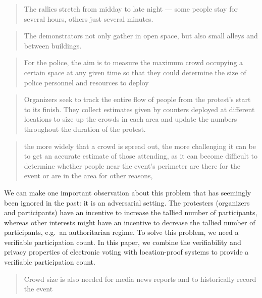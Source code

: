 \blockcquote{2016DemonstrationsInSeoul}{%
  The rallies stretch from midday to late night --- some people stay for 
  several hours, others just several minutes.%
}

\blockcquote{2016DemonstrationsInSeoul}{%
  The demonstrators not only gather in open space, but also small alleys and 
  between buildings.%
}

\blockcquote{2016DemonstrationsInSeoul}{%
  For the police, the aim is to measure the maximum crowd occupying a certain 
  space at any given time so that they could determine the size of police 
  personnel and resources to deploy%
}

\blockcquote{2016DemonstrationsInSeoul}{%
  Organizers seek to track the entire flow of people from the protest’s start 
  to its finish. They collect estimates given by counters deployed at different 
  locations to size up the crowds in each area and update the numbers 
  throughout the duration of the protest.%
}

\blockcquote{HowToEstimateCrowdSize}{%
  the more widely that a crowd is spread out, the more challenging it can be to 
  get an accurate estimate of those attending, as it can become difficult to 
  determine whether people near the event's perimeter are there for the event 
  or are in the area for other reasons,%
}


We can make one important observation about this problem that has seemingly 
been ignored in the past: it is an adversarial setting.
The protesters (organizers and participants) have an incentive to increase the 
tallied number of participants, whereas other interests might have an incentive 
to decrease the tallied number of participants, e.g.\ an authoritarian regime.
To solve this problem, we need a verifiable participation count.
In this paper, we combine the verifiability and privacy properties of 
electronic voting with location-proof systems to provide a verifiable 
participation count.


\blockcquote{HowToEstimateCrowdSize}{%
  Crowd size is also needed for media news reports and to historically record 
  the event%
}


